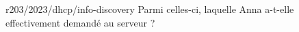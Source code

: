 \begin{question}{r203/2023/dhcp/info-discovery}
  Parmi celles-ci, laquelle Anna a-t-elle effectivement demandé au
  serveur ?
  \begin{reponses}
  \end{reponses}
\end{question}
